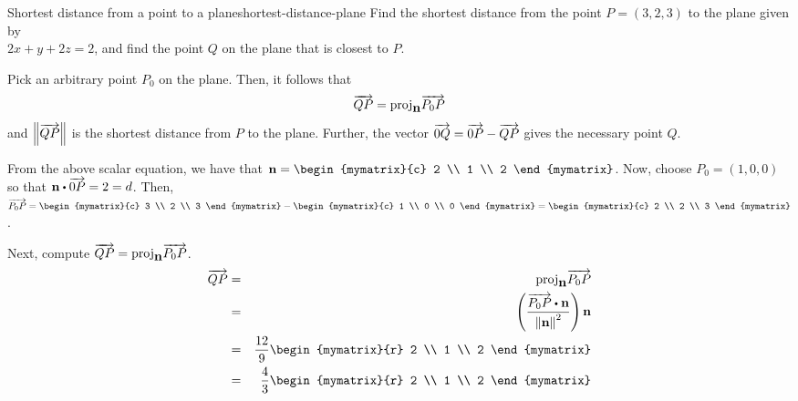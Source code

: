 \begin{example}{Shortest distance from a point to a plane}{shortest-distance-plane}
Find the shortest distance from the point $P = (3,2,3)$ to the plane given by \\ $ 2x + y + 2z = 2$, and find the point $Q$ on the plane that is closest to $P$. 
\end{example}

\begin{solution}
Pick an arbitrary point $P_0$ on the plane. Then, it follows that
\[
\overrightarrow{QP} = \mbox{\rm proj}_{\mbox{\bf n}}\overrightarrow{P_0P}
\]
and $\left\|\overrightarrow{QP}\right\|$ is the shortest distance from $P$ to the plane. Further, the vector $\overrightarrow{0Q} = \overrightarrow{0P} - \overrightarrow{QP}$ gives the necessary point $Q$. 

From the above scalar equation, we have that $\vect{n} = 
\begin{mymatrix}{c}
2 \\
1 \\
2 
\end{mymatrix}$. Now, choose $P_0 = (1, 0, 0)$ so that $\vect{n} \dotprod \longvect{0P} = 2 = d$. 
Then, $\longvect{P_0P} = \begin{mymatrix}{c}
3 \\
2 \\
3
\end{mymatrix}
- 
\begin{mymatrix}{c}
1 \\
0 \\
0
\end{mymatrix}
=
\begin{mymatrix}{c}
2 \\
2 \\
3
\end{mymatrix}$. 

Next, compute $\overrightarrow{QP} = \mbox{\rm proj}_{\mbox{\bf n}}\overrightarrow{P_0P}$. 
\begin{eqnarray*}
\longvect{QP} &=& \func{proj}_{\vect{n}}\longvect{P_0P} \\
&=& \tup{\frac{ \longvect{P_0P} \dotprod \vect{n}}{\norm{\vect{n}} ^2}}\vect{n} \\
&=& \frac{12}{9} \begin{mymatrix}{r}
2 \\
1 \\
2
\end{mymatrix} \\
&=& \frac{4}{3} \begin{mymatrix}{r}
2 \\
1 \\
2
\end{mymatrix} 
\end{eqnarray*}


\end{solution}
